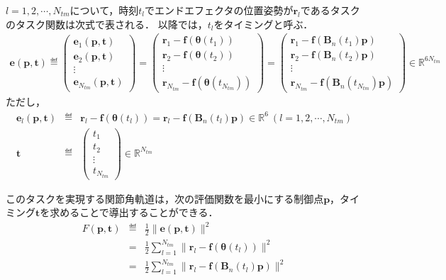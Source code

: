 $l = 1,2,\cdots,{N_{\mathit{tm}}}$について，時刻$t_l$でエンドエフェクタの位置姿勢が$\bm{r}_l$であるタスクのタスク関数は次式で表される．
以降では，$t_l$をタイミングと呼ぶ．
\begin{eqnarray}
  \bm{e}(\bm{p}, \bm{t}) \eqdef
  \begin{pmatrix} \bm{e}_1(\bm{p}, \bm{t}) \\ \bm{e}_2(\bm{p}, \bm{t}) \\ \vdots \\ \bm{e}_{N_{\mathit{tm}}}(\bm{p}, \bm{t}) \end{pmatrix} =
  \begin{pmatrix} \bm{r}_1 - \bm{f}(\bm{\theta}(t_1)) \\ \bm{r}_2 - \bm{f}(\bm{\theta}(t_2)) \\ \vdots \\ \bm{r}_{N_{\mathit{tm}}} - \bm{f}(\bm{\theta}(t_{N_{\mathit{tm}}})) \end{pmatrix} =
  \begin{pmatrix} \bm{r}_1 - \bm{f}(\bm{B}_n(t_1)\bm{p}) \\ \bm{r}_2 - \bm{f}(\bm{B}_n(t_2)\bm{p}) \\ \vdots \\ \bm{r}_{N_{\mathit{tm}}} - \bm{f}(\bm{B}_n(t_{N_{\mathit{tm}}})\bm{p}) \end{pmatrix} \in \mathbb{R}^{6{N_{\mathit{tm}}}} \label{eq:bspline-task}
\end{eqnarray}
ただし，
\begin{eqnarray}
  \bm{e}_l(\bm{p}, \bm{t}) &\eqdef& \bm{r}_l - \bm{f}(\bm{\theta}(t_l)) = \bm{r}_l - \bm{f}(\bm{B}_n(t_l)\bm{p}) \in \mathbb{R}^6 \ (l = 1,2,\cdots,{N_{\mathit{tm}}}) \\
  \bm{t} &\eqdef& \begin{pmatrix} t_1 \\ t_2 \\ \vdots \\ t_{N_{\mathit{tm}}} \end{pmatrix} \in \mathbb{R}^{N_{\mathit{tm}}}
\end{eqnarray}

このタスクを実現する関節角軌道は，次の評価関数を最小にする制御点$\bm{p}$，タイミング$\bm{t}$を求めることで導出することができる．
\begin{eqnarray}
  F(\bm{p}, \bm{t}) &\eqdef& \frac{1}{2} \| \bm{e}(\bm{p}, \bm{t}) \|^2 \\
  &=& \frac{1}{2} \sum_{l=1}^{{N_{\mathit{tm}}}} \| \bm{r}_l - \bm{f}(\bm{\theta}(t_l)) \|^2 \\
  &=& \frac{1}{2} \sum_{l=1}^{{N_{\mathit{tm}}}} \| \bm{r}_l - \bm{f}(\bm{B}_n(t_l) \bm{p}) \|^2 \label{eq:bspline-objective}
\end{eqnarray}


